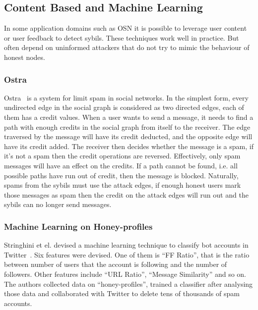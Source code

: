 
\subsection{Content Based and Machine Learning}
\label{sec:content-based}
In some application domains such as OSN it is possible to leverage user content
or user feedback to detect sybils. These techniques work well in practice. But
often depend on uninformed attackers that do not try to mimic the behaviour of
honest nodes.

\subsubsection{Ostra}
Ostra~\cite{mislove2008ostra} is a system for limit spam in social networks.
In the simplest form, every undirected edge in the social graph is considered as
two directed edges, each of them has a credit values. When a user wants to send
a message, it needs to find a path with enough credits in the social graph from
itself to the receiver. The edge traversed by the message will have its credit
deducted, and the opposite edge will have its credit added. The receiver then
decides whether the message is a spam, if it's not a spam then the credit
operations are reversed. Effectively, only spam messages will have an effect on
the credits. If a path cannot be found, i.e. all possible paths have run out of
credit, then the message is blocked. Naturally, spams from the sybils must use
the attack edges, if enough honest users mark those messages as spam then the
credit on the attack edges will run out and the sybils can no longer send
messages.

\subsubsection{Machine Learning on Honey-profiles}
Stringhini et el. devised a machine learning technique to classify bot accounts
in Twitter~\cite{stringhini2010detecting}. Six features were devised. One of
them is ``FF Ratio'', that is the ratio between number of users that the account
is following and the number of followers. Other features include ``URL Ratio'',
``Message Similarity'' and so on. The authors collected data on
``honey-profiles'', trained a classifier after analysing those data and
collaborated with Twitter to delete tens of thousands of spam accounts.

